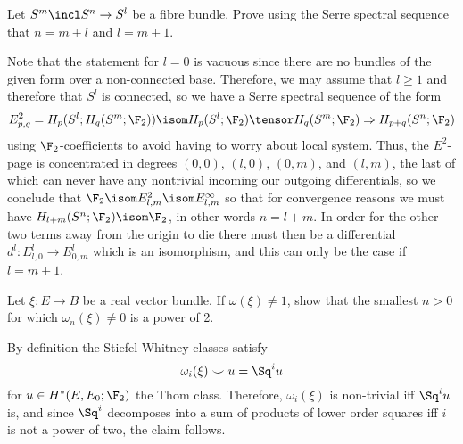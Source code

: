\begin{exercise}
	Let $S^m \incl S^n \to S^l$ be a fibre bundle.
	Prove using the Serre spectral sequence that $n = m + l$ and $l = m + 1$.
\end{exercise}
\begin{solution}
	Note that the statement for $l = 0$ is vacuous since there are no bundles of the given form over a non-connected base.
	Therefore, we may assume that $l \geq 1$ and therefore that $S^l$ is connected, so we have a Serre spectral sequence of the form
	\begin{equation*}
		E^2_{p, q} = H_p(S^l; H_q(S^m; \F_2)) \isom H_p(S^l; \F_2) \tensor H_q(S^m; \F_2) \Rightarrow H_{p + q}(S^n; \F_2)
	\end{equation*}
	using $\F_2$-coefficients to avoid having to worry about local system.
	Thus, the $E^2$-page is concentrated in degrees $(0, 0)$, $(l, 0)$, $(0, m)$, and $(l, m)$, the last of which can never have any nontrivial incoming our outgoing differentials, so we conclude that $\F_2 \isom E^2_{l, m} \isom E^\infty_{l, m}$ so that for convergence reasons we must have $H_{l + m}(S^n; \F_2) \isom \F_2$, in other words $n = l + m$.
	In order for the other two terms away from the origin to die there must then be a differential $d^l\colon E^l_{l, 0} \to E^l_{0, m}$ which is an isomorphism, and this can only be the case if $l = m + 1$.
\end{solution}

\begin{exercise}
	Let $\xi\colon E \to B$ be a real vector bundle.
	If $\omega(\xi) \neq 1$, show that the smallest $n > 0$ for which $\omega_n(\xi) \neq 0$ is a power of 2.
\end{exercise}
\begin{solution}
	By definition the Stiefel Whitney classes satisfy
	\begin{equation*}
		\omega_i(\xi) \smile u = \Sq^i u
	\end{equation*}
	for $u \in H^*(E, E_0; \F_2)$ the Thom class.
	Therefore, $\omega_i(\xi)$ is non-trivial iff $\Sq^i u$ is, and since $\Sq^i$ decomposes into a sum of products of lower order squares iff $i$ is not a power of two, the claim follows.
\end{solution}

